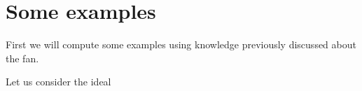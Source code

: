 \section{Some examples}

First we will compute some examples using knowledge previously
discussed about the \grob fan.

\begin{example}
  Let us consider the ideal
\end{example}


